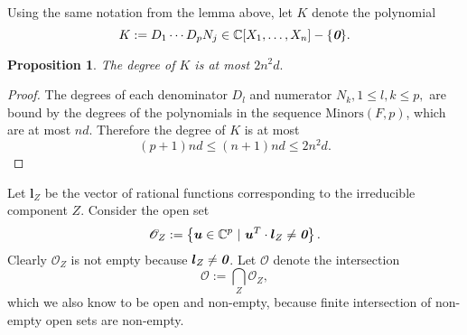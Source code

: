 \documentclass[a4paper]{article}
\def\sO{\mathscr{O}}
\def\bz{\textit{\textbf{0}}}
\def\ub{{\bm u}}
\def\lb{{\bm l}}
\def\minors{\textrm{Minors}(F,p)}
\def\C{\mathbb{C}}
\newtheorem{prop}[theorem]{Proposition}
\begin{document}
\noindent
Using the same notation from the lemma above, let $K$ denote the polynomial 
\begin{equation}\label{eq:K}
K := D_1 \cdots D_p N_j \in \C[X_1,\hdots,X_n] - \{\bz\}.
\end{equation}
%
\begin{prop}\label{prop:Kdegree}
The degree of $K$ is at most $2n^2d.$
\end{prop}
\begin{proof}
The degrees of each denominator $D_l$ and numerator $N_k,  1 \leq l,k \leq p,$ are bound by the degrees of the polynomials in the sequence $\minors$, which are at most $nd.$ Therefore the degree of $K$ is at most \[(p+1)nd \leq (n+1)nd \leq 2n^2d.\] 
\end{proof}
%
\noindent 
Let $\lb_Z$ be the vector of rational functions corresponding to the irreducible component $Z$. Consider the open set
\[
\mathscr{O}_{Z} := 
\left\{\ub \in \C^p~|~\ub^T\cdot \lb_{Z} \not = \textit{\textbf{0}}\right\}.
\]
Clearly $\mathscr{O}_Z$ is not empty because $\lb_{Z} \not = \bz$.  Let $\sO$ denote the intersection
\[
\mathscr{O} := 
\bigcap_Z \mathscr{O}_{Z},
\]
which we also know to be open and non-empty, because finite intersection of non-empty open sets are non-empty.
\end{document}

